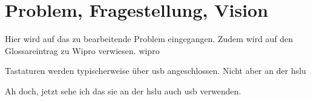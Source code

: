 \chapter{Problem, Fragestellung, Vision}


Hier wird auf das zu bearbeitende Problem eingegangen. Zudem wird auf den Glossareintrag zu Wipro verwiesen. \gls{wipro}

Tastaturen werden typischerweise über \gls{usb} angeschlossen. Nicht aber an der \gls{hslu}

Ah doch, jetzt sehe ich das sie an der \gls{hslu} auch \gls{usb} verwenden.